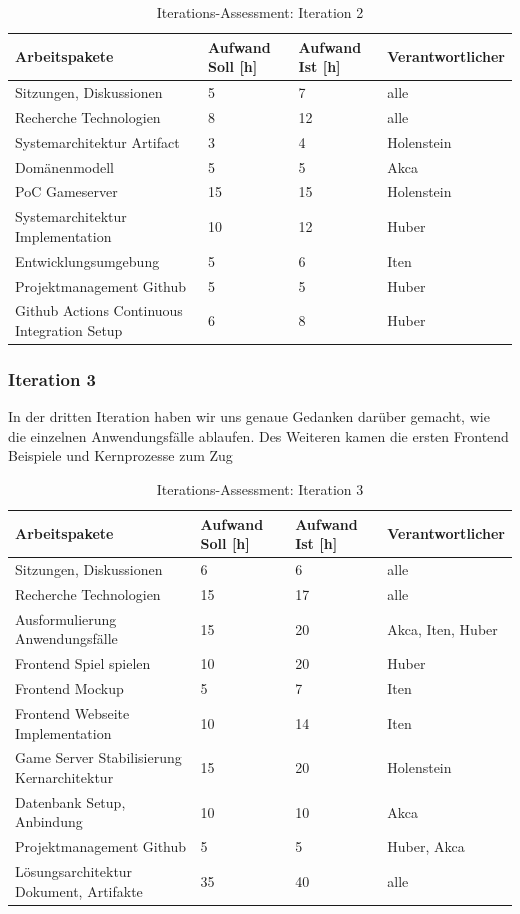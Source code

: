 \documentclass[11pt,ngerman]{article}
\begin{document}
\begin{table}[H]
	\caption{Iterations-Assessment: Iteration 2}
	\begin{tabularx}{\textwidth}{X l l l}
		\toprule
		Arbeitspakete & Aufwand Soll [h] & Aufwand Ist [h] & Verantwortlicher \\
		\toprule
		Sitzungen, Diskussionen & 5 & 7 & alle \\
		Recherche Technologien & 8 & 12 & alle \\
		Systemarchitektur Artifact & 3 & 4 & Holenstein \\
		Domänenmodell & 5 & 5 & Akca \\
		PoC Gameserver & 15 & 15 & Holenstein \\
		Systemarchitektur Implementation & 10 & 12 & Huber \\
		Entwicklungsumgebung & 5 & 6 & Iten \\
		Projektmanagement Github & 5 & 5 & Huber \\
		Github Actions Continuous Integration Setup & 6 & 8 & Huber \\
		\bottomrule
	\end{tabularx}
	\label{tab:Iterations-Assessment: Iteration 2}
\end{table}

\subsubsection{Iteration 3}

In der dritten Iteration haben wir uns genaue Gedanken darüber gemacht, wie die einzelnen Anwendungsfälle ablaufen. Des Weiteren kamen die ersten Frontend Beispiele und Kernprozesse zum Zug

\begin{table}[H]
	\caption{Iterations-Assessment: Iteration 3}
	\begin{tabularx}{\textwidth}{X l l l}
		\toprule
		Arbeitspakete & Aufwand Soll [h] & Aufwand Ist [h] & Verantwortlicher \\
		\toprule
		Sitzungen, Diskussionen & 6 & 6 & alle \\
		Recherche Technologien & 15 & 17 & alle \\
		Ausformulierung Anwendungsfälle & 15 & 20 & Akca, Iten, Huber \\
		Frontend Spiel spielen & 10 & 20 & Huber \\
		Frontend Mockup & 5 & 7 & Iten \\
		Frontend Webseite Implementation & 10 & 14 & Iten \\
		Game Server Stabilisierung Kernarchitektur & 15 & 20 & Holenstein \\
		Datenbank Setup, Anbindung & 10 & 10 & Akca \\
		Projektmanagement Github & 5 & 5 & Huber, Akca \\
		Lösungsarchitektur Dokument, Artifakte & 35 & 40 & alle \\
		\bottomrule
	\end{tabularx}
	\label{tab:Iterations-Assessment: Iteration 3}
\end{table}
\end{document}
